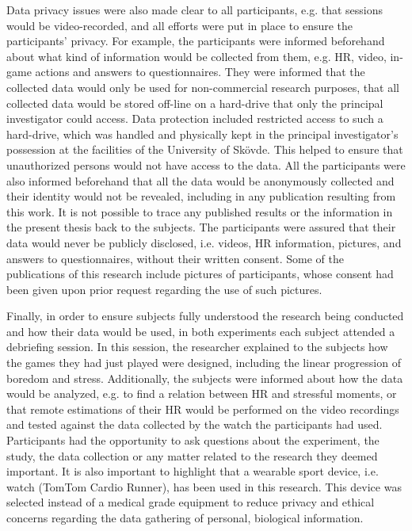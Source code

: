 Data privacy issues were also made clear to all participants, e.g. that sessions would be video-recorded, and all efforts were put in place to ensure the participants' privacy. For example, the participants were informed beforehand about what kind of information would be collected from them, e.g. HR, video, in-game actions and answers to questionnaires. They were informed that the collected data would only be used for non-commercial research purposes, that all collected data would be stored off-line on a hard-drive that only the principal investigator could access. Data protection included restricted access to such a hard-drive, which was handled and physically kept in the principal investigator's possession at the facilities of the University of Sk\"ovde. This helped to ensure that unauthorized persons would not have access to the data. All the participants were also informed beforehand that all the data would be anonymously collected and their identity would not be revealed, including in any publication resulting from this work. It is not possible to trace any published results or the information in the present thesis back to the subjects. The participants were assured that their data would never be publicly disclosed, i.e. videos, HR information, pictures, and answers to questionnaires, without their written consent. Some of the publications of this research include pictures of participants, whose consent had been given upon prior request regarding the use of such pictures.

Finally, in order to ensure subjects fully understood the research being conducted and how their data would be used, in both experiments each subject attended a debriefing session. In this session, the researcher explained to the subjects how the games they had just played were designed, including the linear progression of boredom and stress. Additionally, the subjects were informed about how the data would be analyzed, e.g. to find a relation between HR and stressful moments, or that remote estimations of their HR would be performed on the video recordings and tested against the data collected by the watch the participants had used. Participants had the opportunity to ask questions about the experiment, the study, the data collection or any matter related to the research they deemed important. It is also important to highlight that a wearable sport device, i.e. watch (TomTom Cardio Runner), has been used in this research. This device was selected instead of a medical grade equipment to reduce privacy and ethical concerns regarding the data gathering of personal, biological information.

